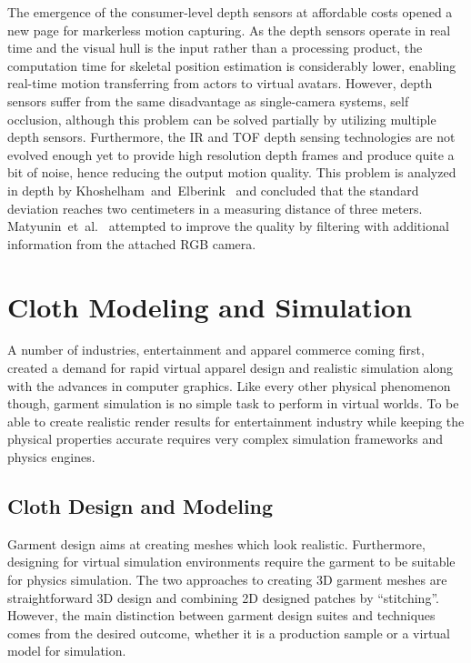  The emergence of the consumer-level depth sensors at affordable costs opened a new page for markerless motion capturing\cite{Dutta2012}. As the depth sensors operate in real time
 and the visual hull is the input rather than a processing product, the computation time for skeletal position estimation is considerably lower, enabling 
 real-time motion transferring from actors to virtual avatars. However, depth sensors suffer from the same disadvantage as single-camera systems, self occlusion,
 although this problem can be solved partially by utilizing multiple depth sensors\cite{Berger2011}.
 Furthermore, the IR and TOF depth sensing technologies are not evolved enough yet to provide high resolution depth frames and produce quite a bit of noise, hence 
 reducing the output motion quality. This problem is analyzed in depth by Khoshelham~and~Elberink~\cite{Khoshelham2012}
 and concluded that the standard deviation reaches two centimeters in a measuring distance of three meters. Matyunin~et~al.~\cite{Matyunin2011} attempted to improve the 
 quality by filtering with additional information from the attached RGB camera.   
 
 \section{Cloth Modeling and Simulation}
 
 A number of industries, entertainment and apparel commerce coming first, created a demand for rapid virtual apparel design and realistic simulation along 
 with the advances in computer graphics. Like every other physical phenomenon though, garment simulation is no simple task to perform in virtual worlds. To be able
 to create realistic render results for entertainment industry while keeping the physical properties accurate requires very complex simulation frameworks and 
 physics engines. 
 
 \subsection{Cloth Design and Modeling}
 
 Garment design aims at creating meshes which look realistic. Furthermore, designing for virtual simulation environments require the garment to be suitable for physics simulation. 
 The two approaches to creating 3D garment meshes are straightforward 3D design and combining 2D designed patches by ``stitching''. However, the main distinction
 between garment design suites and techniques comes from the desired outcome, whether it is a production sample or a virtual model for simulation.
 
